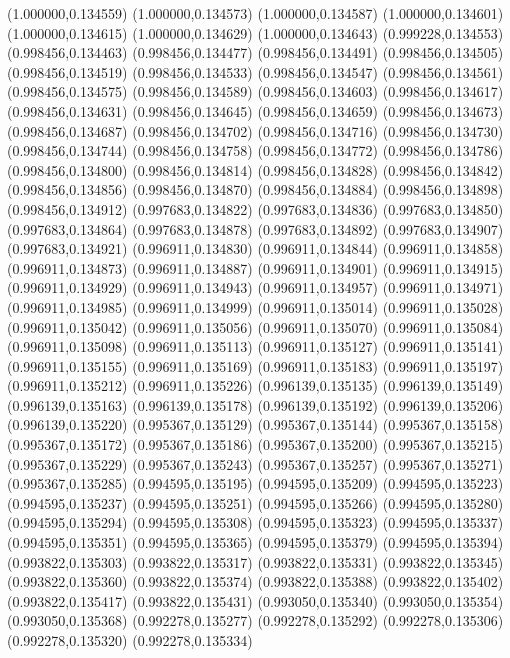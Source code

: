 (1.000000,0.134559)
(1.000000,0.134573)
(1.000000,0.134587)
(1.000000,0.134601)
(1.000000,0.134615)
(1.000000,0.134629)
(1.000000,0.134643)
(0.999228,0.134553)
(0.998456,0.134463)
(0.998456,0.134477)
(0.998456,0.134491)
(0.998456,0.134505)
(0.998456,0.134519)
(0.998456,0.134533)
(0.998456,0.134547)
(0.998456,0.134561)
(0.998456,0.134575)
(0.998456,0.134589)
(0.998456,0.134603)
(0.998456,0.134617)
(0.998456,0.134631)
(0.998456,0.134645)
(0.998456,0.134659)
(0.998456,0.134673)
(0.998456,0.134687)
(0.998456,0.134702)
(0.998456,0.134716)
(0.998456,0.134730)
(0.998456,0.134744)
(0.998456,0.134758)
(0.998456,0.134772)
(0.998456,0.134786)
(0.998456,0.134800)
(0.998456,0.134814)
(0.998456,0.134828)
(0.998456,0.134842)
(0.998456,0.134856)
(0.998456,0.134870)
(0.998456,0.134884)
(0.998456,0.134898)
(0.998456,0.134912)
(0.997683,0.134822)
(0.997683,0.134836)
(0.997683,0.134850)
(0.997683,0.134864)
(0.997683,0.134878)
(0.997683,0.134892)
(0.997683,0.134907)
(0.997683,0.134921)
(0.996911,0.134830)
(0.996911,0.134844)
(0.996911,0.134858)
(0.996911,0.134873)
(0.996911,0.134887)
(0.996911,0.134901)
(0.996911,0.134915)
(0.996911,0.134929)
(0.996911,0.134943)
(0.996911,0.134957)
(0.996911,0.134971)
(0.996911,0.134985)
(0.996911,0.134999)
(0.996911,0.135014)
(0.996911,0.135028)
(0.996911,0.135042)
(0.996911,0.135056)
(0.996911,0.135070)
(0.996911,0.135084)
(0.996911,0.135098)
(0.996911,0.135113)
(0.996911,0.135127)
(0.996911,0.135141)
(0.996911,0.135155)
(0.996911,0.135169)
(0.996911,0.135183)
(0.996911,0.135197)
(0.996911,0.135212)
(0.996911,0.135226)
(0.996139,0.135135)
(0.996139,0.135149)
(0.996139,0.135163)
(0.996139,0.135178)
(0.996139,0.135192)
(0.996139,0.135206)
(0.996139,0.135220)
(0.995367,0.135129)
(0.995367,0.135144)
(0.995367,0.135158)
(0.995367,0.135172)
(0.995367,0.135186)
(0.995367,0.135200)
(0.995367,0.135215)
(0.995367,0.135229)
(0.995367,0.135243)
(0.995367,0.135257)
(0.995367,0.135271)
(0.995367,0.135285)
(0.994595,0.135195)
(0.994595,0.135209)
(0.994595,0.135223)
(0.994595,0.135237)
(0.994595,0.135251)
(0.994595,0.135266)
(0.994595,0.135280)
(0.994595,0.135294)
(0.994595,0.135308)
(0.994595,0.135323)
(0.994595,0.135337)
(0.994595,0.135351)
(0.994595,0.135365)
(0.994595,0.135379)
(0.994595,0.135394)
(0.993822,0.135303)
(0.993822,0.135317)
(0.993822,0.135331)
(0.993822,0.135345)
(0.993822,0.135360)
(0.993822,0.135374)
(0.993822,0.135388)
(0.993822,0.135402)
(0.993822,0.135417)
(0.993822,0.135431)
(0.993050,0.135340)
(0.993050,0.135354)
(0.993050,0.135368)
(0.992278,0.135277)
(0.992278,0.135292)
(0.992278,0.135306)
(0.992278,0.135320)
(0.992278,0.135334)

